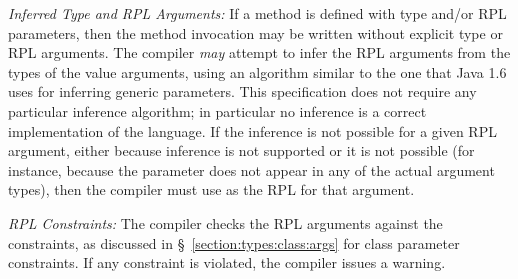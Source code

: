 \noindent
\textit{Inferred Type and RPL Arguments:} If a method is defined with
type and/or RPL parameters, then the method invocation may be written
without explicit type or RPL arguments.  The compiler \emph{may}
attempt to infer the RPL arguments from the types of the value
arguments, using an algorithm similar to the one that Java 1.6 uses
for inferring generic parameters.  This specification does not require
any particular inference algorithm; in particular no inference is a
correct implementation of the language.  If the inference is not
possible for a given RPL argument, either because inference is not
supported or it is not possible (for instance, because the parameter
does not appear in any of the actual argument types), then the
compiler must use  as the RPL for that argument.

\noindent
\textit{RPL Constraints:} The compiler checks the RPL arguments
against the constraints, as discussed in
\S~\ref{section:types:class:args} for class parameter constraints.  If
any constraint is violated, the compiler issues a warning.

